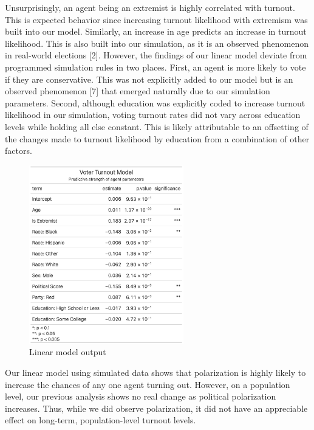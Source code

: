 \documentclass[titlepage, 12pt, leqno]{article} %
\begin{document}
Unsurprisingly, an agent being an extremist is highly correlated with turnout.
This is expected behavior since increasing turnout likelihood with extremism was
built into our model. Similarly, an increase in age predicts an increase in
turnout likelihood. This is also built into our simulation, as it is an observed
phenomenon in real-world elections [2]. However, the findings of our linear 
model deviate from programmed simulation rules in two places. First, an agent is
more likely to vote if they are conservative. This was not explicitly added to
our model but is an observed phenomenon [7] that emerged naturally due to our
simulation parameters. Second, although education was explicitly coded to
increase turnout likelihood in our simulation, voting turnout rates did not vary
across education levels while holding all else constant. This is likely
attributable to an offsetting of the changes made to turnout likelihood by
education from a combination of other factors.

\begin{figure}[ht]
    \centering
    \includegraphics[width=0.6\textwidth]{../plots/table.png}
    \caption{Linear model output}
\end{figure}

Our linear model using simulated data shows that polarization is highly likely 
to increase the chances of any one agent turning out. However, on a population
level, our previous analysis shows no real change as political polarization
increases. Thus, while we did observe polarization, it did not have an
appreciable effect on long-term, population-level turnout levels.

\pagebreak
\end{document}
